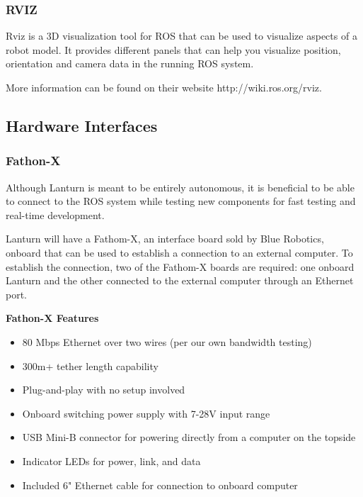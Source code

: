 \subsubsection*{RVIZ}
\label{sec:rviz}

Rviz is a 3D visualization tool for ROS that can be used to visualize aspects
of a robot model. It provides different panels that can help you visualize
position, orientation and camera data in the running ROS system.
\par

More information can be found on their website http://wiki.ros.org/rviz.
\par

\subsection{Hardware Interfaces}
\label{sec:hardware}

\subsubsection*{Fathon-X}
\label{sec:fathon-x}

Although Lanturn is meant to be entirely autonomous, it is beneficial to be
able to connect to the ROS system while testing new components for fast testing
and real-time development. 
\par

Lanturn will have a Fathom-X, an interface board sold by Blue Robotics, onboard
that can be used to establish a connection to an external computer. To
establish the connection, two of the Fathom-X boards are required: one onboard
Lanturn and the other connected to the external computer through an Ethernet
port.
\par

\textbf{Fathon-X Features}
\begin{itemize}
    \item 80 Mbps Ethernet over two wires (per our own bandwidth testing) 
    \item 300m+ tether length capability 
    \item Plug-and-play with no setup involved 
    \item Onboard switching power supply with 7-28V input range 
    \item USB Mini-B connector for powering directly from a computer on the topside 
    \item Indicator LEDs for power, link, and data 
    \item Included 6" Ethernet cable for connection to onboard computer
\end{itemize}


